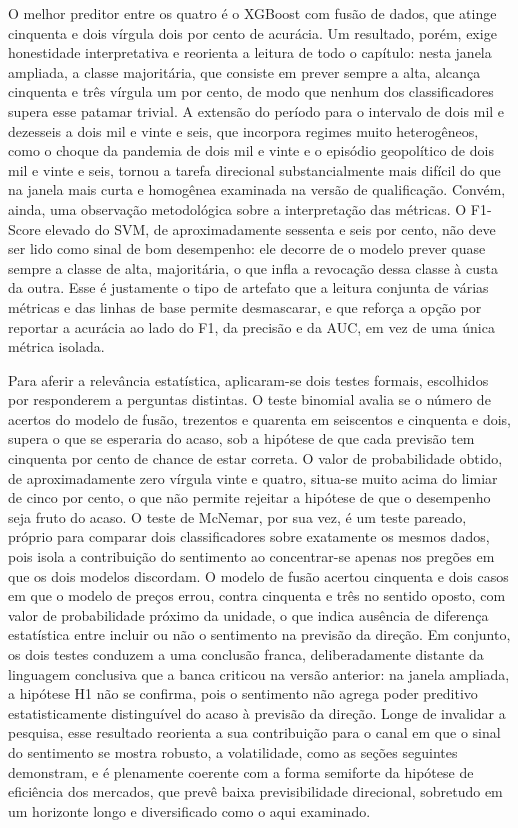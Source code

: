 O melhor preditor entre os quatro é o XGBoost com fusão de dados, que atinge cinquenta e dois vírgula dois por cento de acurácia. Um resultado, porém, exige honestidade interpretativa e reorienta a leitura de todo o capítulo: nesta janela ampliada, a classe majoritária, que consiste em prever sempre a alta, alcança cinquenta e três vírgula um por cento, de modo que nenhum dos classificadores supera esse patamar trivial. A extensão do período para o intervalo de dois mil e dezesseis a dois mil e vinte e seis, que incorpora regimes muito heterogêneos, como o choque da pandemia de dois mil e vinte e o episódio geopolítico de dois mil e vinte e seis, tornou a tarefa direcional substancialmente mais difícil do que na janela mais curta e homogênea examinada na versão de qualificação. Convém, ainda, uma observação metodológica sobre a interpretação das métricas. O F1-Score elevado do SVM, de aproximadamente sessenta e seis por cento, não deve ser lido como sinal de bom desempenho: ele decorre de o modelo prever quase sempre a classe de alta, majoritária, o que infla a revocação dessa classe à custa da outra. Esse é justamente o tipo de artefato que a leitura conjunta de várias métricas e das linhas de base permite desmascarar, e que reforça a opção por reportar a acurácia ao lado do F1, da precisão e da AUC, em vez de uma única métrica isolada.

Para aferir a relevância estatística, aplicaram-se dois testes formais, escolhidos por responderem a perguntas distintas. O teste binomial avalia se o número de acertos do modelo de fusão, trezentos e quarenta em seiscentos e cinquenta e dois, supera o que se esperaria do acaso, sob a hipótese de que cada previsão tem cinquenta por cento de chance de estar correta. O valor de probabilidade obtido, de aproximadamente zero vírgula vinte e quatro, situa-se muito acima do limiar de cinco por cento, o que não permite rejeitar a hipótese de que o desempenho seja fruto do acaso. O teste de McNemar, por sua vez, é um teste pareado, próprio para comparar dois classificadores sobre exatamente os mesmos dados, pois isola a contribuição do sentimento ao concentrar-se apenas nos pregões em que os dois modelos discordam. O modelo de fusão acertou cinquenta e dois casos em que o modelo de preços errou, contra cinquenta e três no sentido oposto, com valor de probabilidade próximo da unidade, o que indica ausência de diferença estatística entre incluir ou não o sentimento na previsão da direção. Em conjunto, os dois testes conduzem a uma conclusão franca, deliberadamente distante da linguagem conclusiva que a banca criticou na versão anterior: na janela ampliada, a hipótese H1 não se confirma, pois o sentimento não agrega poder preditivo estatisticamente distinguível do acaso à previsão da direção. Longe de invalidar a pesquisa, esse resultado reorienta a sua contribuição para o canal em que o sinal do sentimento se mostra robusto, a volatilidade, como as seções seguintes demonstram, e é plenamente coerente com a forma semiforte da hipótese de eficiência dos mercados, que prevê baixa previsibilidade direcional, sobretudo em um horizonte longo e diversificado como o aqui examinado.

